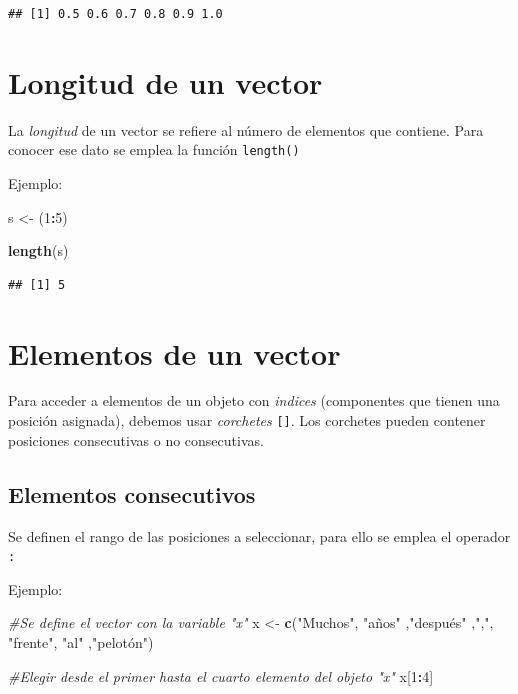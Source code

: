 \documentclass[
]{book}
\newenvironment{Shaded}{\begin{snugshade}}{\end{snugshade}}
\newcommand{\CommentTok}[1]{\textcolor[rgb]{0.56,0.35,0.01}{\textit{#1}}}
\newcommand{\DecValTok}[1]{\textcolor[rgb]{0.00,0.00,0.81}{#1}}
\newcommand{\FunctionTok}[1]{\textcolor[rgb]{0.13,0.29,0.53}{\textbf{#1}}}
\newcommand{\NormalTok}[1]{#1}
\newcommand{\OtherTok}[1]{\textcolor[rgb]{0.56,0.35,0.01}{#1}}
\newcommand{\SpecialCharTok}[1]{\textcolor[rgb]{0.81,0.36,0.00}{\textbf{#1}}}
\newcommand{\StringTok}[1]{\textcolor[rgb]{0.31,0.60,0.02}{#1}}
\begin{document}
\begin{verbatim}
## [1] 0.5 0.6 0.7 0.8 0.9 1.0
\end{verbatim}

\section{Longitud de un vector}\label{longitud-de-un-vector}

La \emph{longitud} de un vector se refiere al número de elementos que contiene. Para conocer ese dato se emplea la función \texttt{length()}

Ejemplo:

\begin{Shaded}
\begin{Highlighting}[]
\NormalTok{s }\OtherTok{\textless{}{-}}\NormalTok{ (}\DecValTok{1}\SpecialCharTok{:}\DecValTok{5}\NormalTok{)}

\FunctionTok{length}\NormalTok{(s)}
\end{Highlighting}
\end{Shaded}

\begin{verbatim}
## [1] 5
\end{verbatim}

\section{Elementos de un vector}\label{elementos-de-un-vector}

Para acceder a elementos de un objeto con \emph{indices} (componentes que tienen una posición asignada), debemos usar \emph{corchetes} \texttt{{[}{]}}. Los corchetes pueden contener posiciones consecutivas o no consecutivas.

\subsection{Elementos consecutivos}\label{elementos-consecutivos}

Se definen el rango de las posiciones a seleccionar, para ello se emplea el operador \texttt{:}

Ejemplo:

\begin{Shaded}
\begin{Highlighting}[]
\CommentTok{\#Se define el vector con la variable "x"}
\NormalTok{x }\OtherTok{\textless{}{-}} \FunctionTok{c}\NormalTok{(}\StringTok{"Muchos"}\NormalTok{, }\StringTok{"años"}\NormalTok{ ,}\StringTok{"después"}\NormalTok{ ,}\StringTok{","}\NormalTok{, }\StringTok{"frente"}\NormalTok{, }\StringTok{"al"}\NormalTok{ ,}\StringTok{"pelotón"}\NormalTok{)}

\CommentTok{\#Elegir desde el primer hasta el cuarto elemento del objeto "x"}
\NormalTok{x[}\DecValTok{1}\SpecialCharTok{:}\DecValTok{4}\NormalTok{]}
\end{Highlighting}
\end{Shaded}
\end{document}
